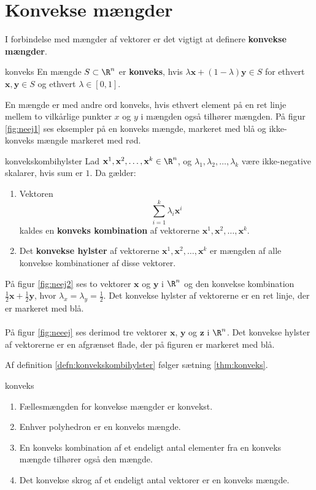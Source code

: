 \section{Konvekse mængder}
%
I forbindelse med mængder af vektorer er det vigtigt at definere \textbf{konvekse mængder}.
%
\begin{defn}{}{konveks}
En mængde $S \subset \R^n$ er \textbf{konveks}, hvis $\lambda \textbf{x} + (1- \lambda ) \textbf{y} \in S$ for ethvert $\textbf{x}, \textbf{y} \in S$ og ethvert $\lambda \in [0,1]$. 
\end{defn}
\noindent
%
En mængde er med andre ord konveks, hvis ethvert element på en ret linje mellem to vilkårlige punkter $x$ og $y$ i mængden også tilhører mængden. 
På figur \ref{fig:neej1} ses eksempler på en konveks mængde, markeret med blå og ikke-konveks mængde markeret med rød. 
%

%
\begin{defn}{}{konvekskombihylster}
Lad $\textbf{x}^1, \textbf{x}^2, \ldots, \textbf{x}^k \in \R^n$, og $\lambda_1, \lambda_2, \ldots, \lambda_k$ være ikke-negative skalarer, hvis sum er $1$. Da gælder:
%
\begin{enumerate}[label=(\alph*)]
	\item Vektoren $$\sum_{i=1}^{k} \lambda_i \textbf{x}^i$$ kaldes en \textbf{konveks kombination} af vektorerne $\textbf{x}^1, \textbf{x}^2, \ldots, \textbf{x}^k$. 
	\item Det \textbf{konvekse hylster} af vektorerne $\textbf{x}^1, \textbf{x}^2, \ldots, \textbf{x}^k$ er mængden af alle konvekse kombinationer af disse vektorer. 
\end{enumerate}
%
%
\end{defn}
%
På figur \ref{fig:neej2} ses to vektorer $\mathbf{x}$ og $\mathbf{y}$ i $\R^n$ og den konvekse kombination $\frac{1}{2} \mathbf{x}+\frac{1}{2} \mathbf{y}$, hvor $\lambda_x = \lambda_y = \frac{1}{2}$. 
Det konvekse hylster af vektorerne er en ret linje, der er markeret med blå. 
\\\\
%

%
På figur \ref{fig:neeej} ses derimod tre vektorer $\mathbf{x}$, $\mathbf{y}$ og $\mathbf{z}$ i $\R^n$. 
Det konvekse hylster af vektorerne er en afgrænset flade, der på figuren er markeret med blå.
%

%
Af definition \ref{defn:konvekskombihylster} følger sætning \ref{thm:konveks}.
%
\begin{thm}{}{konveks}
\begin{enumerate}[label=(\alph*)]
	\item Fællesmængden for konvekse mængder er konvekst. 
	\item Enhver polyhedron er en konveks mængde.
	\item En konveks kombination af et endeligt antal elementer fra en konveks mængde tilhører også den mængde. 
	\item Det konvekse skrog af et endeligt antal vektorer er en konveks mængde. 
\end{enumerate}
\end{thm}
